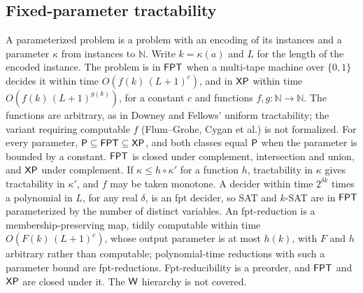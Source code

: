\begin{result}
\subsection{Fixed-parameter tractability}
A parameterized problem is a problem with an encoding of its instances and a parameter
$\kappa$ from instances to $\mathbb{N}$. Write $k=\kappa(a)$ and $L$ for the length of the encoded
instance. The problem is in $\mathsf{FPT}$ when a multi-tape machine over $\{0,1\}$ decides it within
time $O(f(k)\,(L+1)^c)$, and in $\mathsf{XP}$ within time $O(f(k)\,(L+1)^{g(k)})$, for a constant $c$
and functions $f,g\colon\mathbb{N}\to\mathbb{N}$. The functions are arbitrary, as in Downey and
Fellows' uniform tractability; the variant requiring computable $f$ (Flum--Grohe, Cygan et al.)
is not formalized. For every parameter, $\mathsf{P}\subseteq\mathsf{FPT}\subseteq\mathsf{XP}$, and both classes
equal $\mathsf{P}$ when the parameter is bounded by a constant. $\mathsf{FPT}$ is closed under complement,
intersection and union, and $\mathsf{XP}$ under complement. If $\kappa\le h\circ\kappa'$ for a
function $h$, tractability in $\kappa$ gives tractability in $\kappa'$, and $f$ may be taken
monotone. A decider within time $2^{\delta k}$ times a polynomial in $L$, for any real $\delta$, is
an fpt decider, so SAT and $k$-SAT are in $\mathsf{FPT}$ parameterized by the number of distinct
variables. An fpt-reduction is a membership-preserving map, tidily computable within time
$O(F(k)\,(L+1)^c)$, whose output parameter is at most $h(k)$, with $F$ and $h$ arbitrary rather
than computable; polynomial-time reductions with such a parameter bound are fpt-reductions.
Fpt-reducibility is a preorder, and $\mathsf{FPT}$ and $\mathsf{XP}$ are closed under it. The $\mathsf{W}$
hierarchy is not covered.
\citep{DowneyFellows1999,FlumGrohe2006,CyganEtAl2015}

\end{result}
